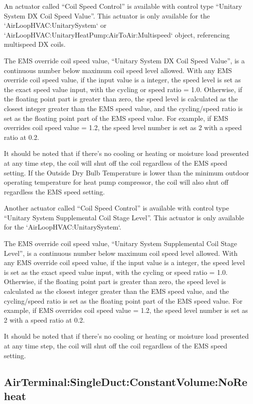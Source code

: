 An actuator called ``Coil Speed Control'' is available with control type ``Unitary System DX Coil Speed Value''. This actuator is only available for the `AirLoopHVAC:UnitarySystem` or `AirLoopHVAC:UnitaryHeatPump:AirToAir:Multispeed` object, referencing multispeed DX coils.

The EMS override coil speed value, “Unitary System DX Coil Speed Value”, is a continuous number below maximum coil speed level allowed. With any EMS override coil speed value, if the input value is a integer, the speed level is set as the exact speed value input, with the cycling or speed ratio = 1.0. Otherwise, if the floating point part is greater than zero, the speed level is calculated as the closest integer greater than the EMS speed value, and the cycling/speed ratio is set as the floating point part of the EMS speed value. For example, if EMS overrides coil speed value = 1.2, the speed level number is set as 2 with a speed ratio at 0.2.

It should be noted that if there's no cooling or heating or moisture load presented at any time step, the coil will shut off the coil regardless of the EMS speed setting. If the Outside Dry Bulb Temperature is lower than the minimum outdoor operating temperature for heat pump compressor, the coil will also shut off regardless the EMS speed setting.

Another actuator called ``Coil Speed Control'' is available with control type ``Unitary System Supplemental Coil Stage Level''. This actuator is only available for the `AirLoopHVAC:UnitarySystem`.

The EMS override coil speed value, “Unitary System Supplemental Coil Stage Level”, is a continuous number below maximum coil speed level allowed. With any EMS override coil speed value, if the input value is a integer, the speed level is set as the exact speed value input, with the cycling or speed ratio = 1.0. Otherwise, if the floating point part is greater than zero, the speed level is calculated as the closest integer greater than the EMS speed value, and the cycling/speed ratio is set as the floating point part of the EMS speed value. For example, if EMS overrides coil speed value = 1.2, the speed level number is set as 2 with a speed ratio at 0.2.

It should be noted that if there's no cooling or heating or moisture load presented at any time step, the coil will shut off the coil regardless of the EMS speed setting.


\subsection{AirTerminal:SingleDuct:ConstantVolume:NoReheat}\label{airTerminalsingleductconstantvolumenoreheat}

